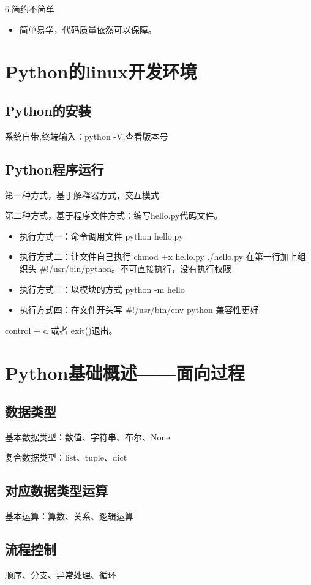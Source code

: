 \documentclass[UTF8]{ctexart}
\begin{document}
6.简约不简单
\begin{itemize}
   \item  简单易学，代码质量依然可以保障。
\end{itemize}
\section{Python的linux开发环境}
\subsection{Python的安装}
系统自带,终端输入：python -V,查看版本号
\subsection{Python程序运行}
第一种方式，基于解释器方式，交互模式

第二种方式，基于程序文件方式：编写hello.py代码文件。

\begin{itemize}
\item 执行方式一：命令调用文件 python hello.py

\item 执行方式二：让文件自己执行 chmod +x hello.py  ./hello.py 在第一行加上组织头 \#!/usr/bin/python。不可直接执行，没有执行权限

\item 执行方式三：以模块的方式 python -m hello

\item 执行方式四：在文件开头写 \#!/usr/bin/env python 兼容性更好
\end{itemize}

control + d 或者 exit()退出。
\section{Python基础概述——面向过程}
\subsection{数据类型}
基本数据类型：数值、字符串、布尔、None

复合数据类型：list、tuple、dict
\subsection{对应数据类型运算}
基本运算：算数、关系、逻辑运算
\subsection{流程控制}
顺序、分支、异常处理、循环
\end{document}
